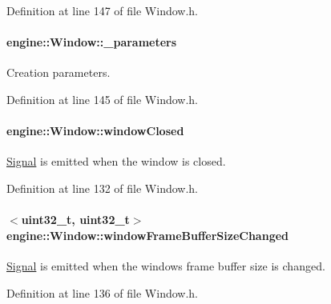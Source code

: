 Definition at line 147 of file Window.\+h.

\paragraph[{\texorpdfstring{\+\_\+parameters}{_parameters}}]{ engine\+::\+Window\+::\+\_\+parameters\hspace{0.3cm}{\ttfamily [protected]}}\hypertarget{a00082_aae1d39f3df529497025772967ac578a0}{}\label{a00082_aae1d39f3df529497025772967ac578a0}
Creation parameters. 

Definition at line 145 of file Window.\+h.

\paragraph[{\texorpdfstring{window\+Closed}{windowClosed}}]{ engine\+::\+Window\+::window\+Closed}\hypertarget{a00082_a5bb494c228eb398d6893327fcf03d2d3}{}\label{a00082_a5bb494c228eb398d6893327fcf03d2d3}
\hyperlink{a00065}{Signal} is emitted when the window is closed. 

Definition at line 132 of file Window.\+h.

\paragraph[{\texorpdfstring{window\+Frame\+Buffer\+Size\+Changed}{windowFrameBufferSizeChanged}}]{$<$uint32\+\_\+t, uint32\+\_\+t$>$ engine\+::\+Window\+::window\+Frame\+Buffer\+Size\+Changed}\hypertarget{a00082_a0c6ef7abcac1063c91a84123c81f9347}{}\label{a00082_a0c6ef7abcac1063c91a84123c81f9347}
\hyperlink{a00065}{Signal} is emitted when the window\textquotesingle{}s frame buffer size is changed. 

Definition at line 136 of file Window.\+h.

